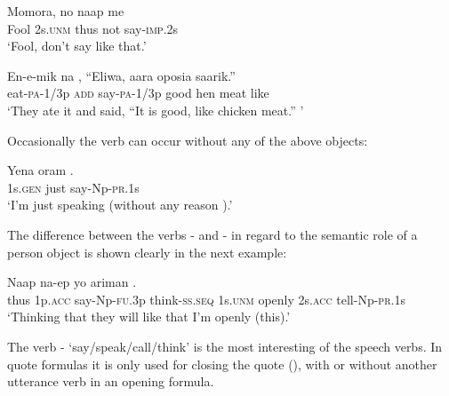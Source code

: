\ea%
\label{ex:x319}
\gll Momora, no naap me  \\
Fool 2s.\textsc{unm} thus not say-\textsc{imp}.2s \\
\glt`Fool, don't say like that.'
\z

\ea%
\label{ex:x320}
\gll En-e-mik na{\footnotemark} , ``Eliwa, aara oposia saarik.'' \\
eat-\textsc{pa}-1/3p \textsc{add} say-\textsc{pa}-1/3p good hen meat like\\
\glt`They ate it and said, ``It is good, like chicken meat.'' '
\z


Occasionally the verb can occur without any of the above objects:

\ea%
\label{ex:x321}
\gll Yena oram . \\
1s.\textsc{gen} just say-Np-\textsc{pr}.1s \\
\glt`I'm just speaking (without any reason ).'
\z

The difference between the verbs - and - in regard to the semantic role of a person object is shown clearly in the next example:

\ea%
\label{ex:x322}
\gll Naap   na-ep yo ariman   .
\\
thus 1p.\textsc{acc} say-Np-\textsc{fu}.3p think-\textsc{ss}.\textsc{seq} 1s.\textsc{unm} openly 2s.\textsc{acc} tell-Np-\textsc{pr}.1s\\
\glt`Thinking that they will  like that  I'm openly  (this).'
\z

The verb - `say/speak/call/think' is the most interesting of the speech verbs. In quote formulas it is only used for closing the quote (), with or without another utterance verb in an opening formula.

